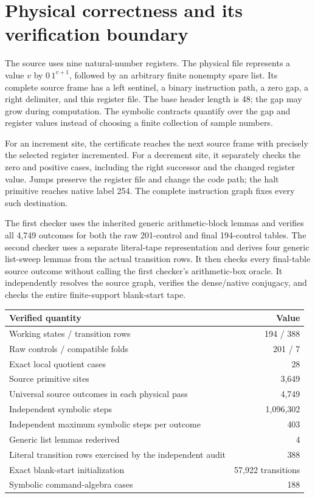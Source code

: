 \documentclass[11pt,letterpaper]{article}
\begin{document}



\section{Physical correctness and its verification boundary}
\label{sec:physical}

The source uses nine natural-number registers. The physical file represents
a value $v$ by $0\,1^{v+1}$, followed by an arbitrary finite nonempty spare
list. Its complete source frame has a left sentinel, a binary instruction
path, a zero gap, a right delimiter, and this register file. The base
header length is 48; the gap may grow during computation. The symbolic
contracts quantify over the gap and register values instead of choosing
a finite collection of sample numbers.

For an increment site, the certificate reaches the next source frame
with precisely the selected register incremented. For a decrement site,
it separately checks the zero and positive cases, including the right
successor and the changed register value. Jumps preserve the register
file and change the code path; the halt primitive reaches native label
254. The complete instruction graph fixes every such destination.

The first checker uses the inherited generic arithmetic-block lemmas and
verifies all 4,749 outcomes for both the raw 201-control and final
194-control tables. The second checker uses a separate literal-tape
representation and derives four generic list-sweep lemmas from the actual
transition rows. It then checks every final-table source outcome without
calling the first checker's arithmetic-box oracle. It independently resolves
the source graph, verifies the dense/native conjugacy, and checks the
entire finite-support blank-start tape.

\begin{center}\small
\begin{tabular}{@{}lr@{}}
\toprule
Verified quantity & Value\\
\midrule
Working states / transition rows &194 / 388\\
Raw controls / compatible folds &201 / 7\\
Exact local quotient cases &28\\
Source primitive sites &3,649\\
Universal source outcomes in each physical pass &4,749\\
Independent symbolic steps &1,096,302\\
Independent maximum symbolic steps per outcome &403\\
Generic list lemmas rederived &4\\
Literal transition rows exercised by the independent audit &388\\
Exact blank-start initialization &57,922 transitions\\
Symbolic command-algebra cases &188\\
\bottomrule
\end{tabular}
\end{center}
\end{document}
